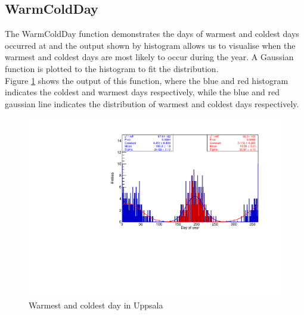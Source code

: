 \documentclass[a4paper,12pt]{article}
\begin{document}
\subsection{WarmColdDay}

The WarmColdDay function demonstrates the days of warmest and coldest days occurred at and the output shown by histogram allows us to visualise when the warmest and coldest days are most likely to occur during the year. A Gaussian function is plotted to the histogram to fit the distribution.\\

Figure \ref{fig:WarmCold} shows the output of this function, where the blue and red histogram indicates the coldest and warmest days respectively, while the blue and red gaussian line indicates the distribution of warmest and coldest days respectively. 







\begin{figure}[h!]
    \centering
    \includegraphics[scale = 0.8]{uppsala.pdf}
    \caption{Warmest and coldest day in Uppsala}
    \label{fig:WarmCold}
\end{figure}
\end{document}
